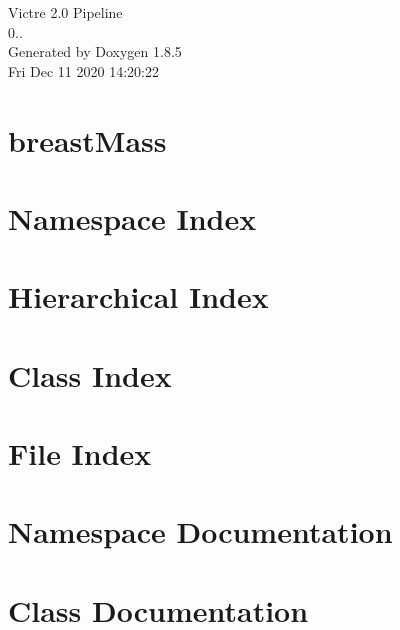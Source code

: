 \documentclass[twoside]{book}
\newcommand{\clearemptydoublepage}{%
  \newpage{\pagestyle{empty}\cleardoublepage}%
}
\begin{document}
\hypersetup{pageanchor=false}
\begin{titlepage}
\vspace*{7cm}
\begin{center}%
{\Large Victre 2.0 Pipeline \\[1ex]\large 0.. }\\
\vspace*{1cm}
{\large Generated by Doxygen 1.8.5}\\
\vspace*{0.5cm}
{\small Fri Dec 11 2020 14:20:22}\\
\end{center}
\end{titlepage}
\clearemptydoublepage
\tableofcontents
\clearemptydoublepage
{}
\hypersetup{pageanchor=true}

\chapter{breast\-Mass}
\label{md_Victre_breastMass_README}
\hypertarget{md_Victre_breastMass_README}{}

\chapter{Namespace Index}

\chapter{Hierarchical Index}

\chapter{Class Index}

\chapter{File Index}

\chapter{Namespace Documentation}










\chapter{Class Documentation}



\end{document}

